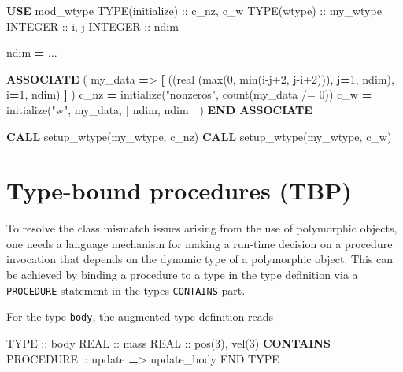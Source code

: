 \documentclass[]{scrartcl}
\newenvironment{Shaded}{}{}
\newcommand{\DataTypeTok}[1]{\textcolor[rgb]{0.56,0.13,0.00}{#1}}
\newcommand{\DecValTok}[1]{\textcolor[rgb]{0.25,0.63,0.44}{#1}}
\newcommand{\FunctionTok}[1]{\textcolor[rgb]{0.02,0.16,0.49}{#1}}
\newcommand{\KeywordTok}[1]{\textcolor[rgb]{0.00,0.44,0.13}{\textbf{#1}}}
\newcommand{\NormalTok}[1]{#1}
\newcommand{\OperatorTok}[1]{\textcolor[rgb]{0.40,0.40,0.40}{#1}}
\newcommand{\StringTok}[1]{\textcolor[rgb]{0.25,0.44,0.63}{#1}}
\begin{document}
\begin{Shaded}
\begin{Highlighting}[]
\KeywordTok{USE}\NormalTok{ mod\_wtype}
\DataTypeTok{TYPE(initialize)} \DataTypeTok{::}\NormalTok{ c\_nz, c\_w}
\DataTypeTok{TYPE(wtype)} \DataTypeTok{::}\NormalTok{ my\_wtype}
\DataTypeTok{INTEGER} \DataTypeTok{::}\NormalTok{ i, j}
\DataTypeTok{INTEGER} \DataTypeTok{::}\NormalTok{ ndim}

\NormalTok{ndim }\KeywordTok{=}\NormalTok{ ...}

\KeywordTok{ASSOCIATE}\NormalTok{ ( my\_data }\KeywordTok{=}\OperatorTok{\textgreater{}} \KeywordTok{[}\NormalTok{ ((}\DataTypeTok{real (max(0, min(i{-}j+2, j{-}i+2)))}\NormalTok{, j}\KeywordTok{=}\DecValTok{1}\NormalTok{, ndim), i}\KeywordTok{=}\DecValTok{1}\NormalTok{, ndim) }\KeywordTok{]}\NormalTok{ )}
\NormalTok{   c\_nz }\KeywordTok{=}\NormalTok{ initialize(}\StringTok{"nonzeros"}\NormalTok{, }\FunctionTok{count}\NormalTok{(my\_data }\OperatorTok{/=} \DecValTok{0}\NormalTok{))}
\NormalTok{   c\_w }\KeywordTok{=}\NormalTok{ initialize(}\StringTok{"w"}\NormalTok{, my\_data, }\KeywordTok{[}\NormalTok{ ndim, ndim }\KeywordTok{]}\NormalTok{ )}
\KeywordTok{END ASSOCIATE}

\KeywordTok{CALL}\NormalTok{ setup\_wtype(my\_wtype, c\_nz)}
\KeywordTok{CALL}\NormalTok{ setup\_wtype(my\_wtype, c\_w)}
\end{Highlighting}
\end{Shaded}

\section{Type-bound procedures (TBP)}\label{type-bound-procedures-tbp}

To resolve the class mismatch issues arising from the use of polymorphic
objects, one needs a language mechanism for making a run-time decision
on a procedure invocation that depends on the dynamic type of a
polymorphic object. This can be achieved by binding a procedure to a
type in the type definition via a \texttt{PROCEDURE} statement in the
type\textquotesingle s \texttt{CONTAINS} part.

For the type \texttt{body}, the augmented type definition reads

\begin{Shaded}
\begin{Highlighting}[]
\DataTypeTok{TYPE} \DataTypeTok{::}\NormalTok{ body}
   \DataTypeTok{REAL} \DataTypeTok{::}\NormalTok{ mass}
   \DataTypeTok{REAL} \DataTypeTok{::}\NormalTok{ pos(}\DecValTok{3}\NormalTok{), vel(}\DecValTok{3}\NormalTok{)}
\KeywordTok{CONTAINS}
   \DataTypeTok{PROCEDURE} \DataTypeTok{::}\NormalTok{ update }\KeywordTok{=}\OperatorTok{\textgreater{}}\NormalTok{ update\_body}
\DataTypeTok{END TYPE}
\end{Highlighting}
\end{Shaded}
\end{document}
